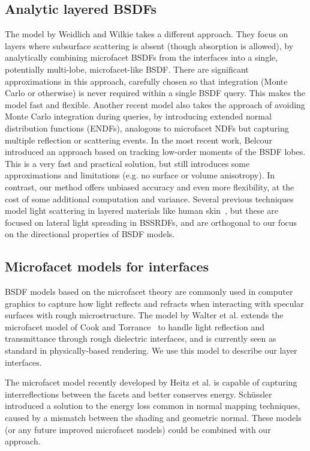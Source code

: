 \subsection{Analytic layered BSDFs}
The model by Weidlich and Wilkie \cite{weidlich2007arbitrarily} takes a different approach. They focus on layers where subsurface scattering is absent (though absorption is allowed), by analytically combining microfacet BSDFs from the interfaces into a single, potentially multi-lobe, microfacet-like BSDF. There are significant approximations in this approach, carefully chosen so that integration (Monte Carlo or otherwise) is never required within a single BSDF query. This makes the model fast and flexible. Another recent model \cite{guo2016rendering} also takes the approach of avoiding Monte Carlo integration during queries, by introducing extended normal distribution functions (ENDFs), analogous to microfacet NDFs but capturing multiple reflection or scattering events. In the most recent work, Belcour \cite{belcour2018efficient} introduced an approach based on tracking low-order moments of the BSDF lobes. This is a very fast and practical solution, but still introduces some approximations and limitations (e.g. no surface or volume anisotropy). In contrast, our method offers unbiased accuracy and even more flexibility, at the cost of some additional computation and variance. Several previous techniques model light scattering in layered materials like human skin~\cite{donner2008layered}, but these are focused on lateral light spreading in BSSRDFs, and are orthogonal to our focus on the directional properties of BSDF models.

\subsection{Microfacet models for interfaces}
BSDF models based on the microfacet theory are commonly used in computer graphics to capture how light reflects and refracts when interacting with specular surfaces with rough microstructure. The model by Walter et al. \cite{walter2007microfacet} extends the microfacet model of Cook and Torrance~\cite{cook1982reflectance} to handle light reflection and transmittance through rough dielectric interfaces, and is currently seen as standard in physically-based rendering. We use this model to describe our layer interfaces.

The microfacet model recently developed by Heitz et al.\cite{heitz2016multiple} is capable of capturing interreflections between the facets and better conserves energy. Sch\"ussler \cite{schussler2017microfacet} introduced a solution to the energy loss common in normal mapping techniques, caused by a mismatch between the shading and geometric normal. These models (or any future improved microfacet models) could be combined with our approach.

